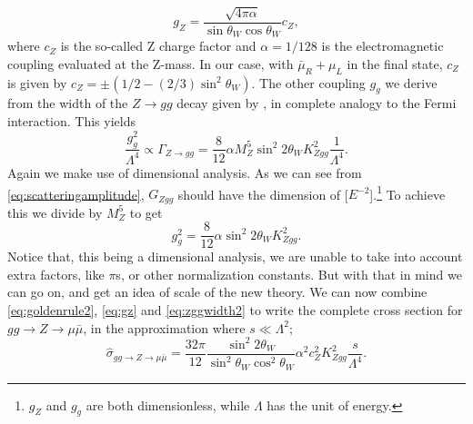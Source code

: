 \begin{equation} \label{eq:gz}
	g_Z = \frac{\sqrt{4\pi\alpha}}{\sin{\theta_W}\cos{\theta_W}} c_Z,
\end{equation}
where $c_Z$ is the so-called Z charge factor and $\alpha = 1/128$ is the electromagnetic coupling evaluated at the Z-mass. In our case, with $\bar \mu_R + \mu_L$ in the final state, $c_Z$ is given by $c_Z = \pm (1/2 - (2/3)\sin^2{\theta_W})$. The other coupling $g_g$ we derive from the width of the $Z \rightarrow gg$ decay given by \cite{behr2003dnc}, in complete analogy to the Fermi interaction. This yields
\begin{equation} \label{eq:zggwidth2}
	\frac{g_g^2}{\Lambda^4} \propto \Gamma_{Z \rightarrow gg} = \frac{8}{12} \alpha M_Z^5 \sin^2{2\theta_W} K_{Zgg}^2 \frac{1}{\Lambda^4}.
\end{equation}
Again we make use of dimensional analysis. As we can see from \eqref{eq:scatteringamplitude}, $G_{Zgg}$ should have the dimension of [$E^{-2}$].\footnote{$g_Z$ and $g_g$ are both dimensionless, while $\Lambda$ has the unit of energy.} To achieve this we divide by $M_Z^5$ to get
\begin{equation}
	g_g^2 = \frac{8}{12} \alpha \sin^2{2\theta_W} K_{Zgg}^2.
\end{equation}
Notice that, this being a dimensional analysis, we are unable to take into account extra factors, like $\pi$s, or other normalization constants. But with that in mind we can go on, and get an idea of scale of the new theory. We can now combine \eqref{eq:goldenrule2}, \eqref{eq:gz} and \eqref{eq:zggwidth2} to write the complete cross section for $gg \rightarrow Z \rightarrow \mu \bar \mu$, in the approximation where $s \ll \Lambda^2$;
\begin{equation} \label{eq:sigmahatgg}
	\hat \sigma_{gg \rightarrow Z \rightarrow \mu \bar \mu} = \frac{32\pi}{12} \frac{\sin^2{2\theta_W}}{\sin^2{\theta_W}\cos^2{\theta_W}} \alpha^2 c_Z^2 K_{Zgg}^2 \frac{s}{\Lambda^4}.
\end{equation}


